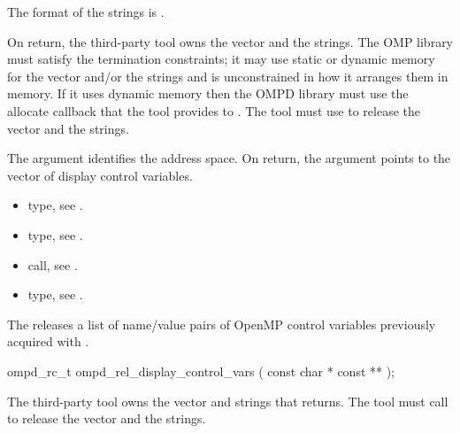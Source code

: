 The format of the strings is .

On return, the third-party tool owns the vector and the strings. The OMP library
must satisfy the termination constraints; it may use static or dynamic memory 
for the vector and/or the strings and is unconstrained in how it arranges them 
in memory. If it uses dynamic memory then the OMPD library must use the allocate 
callback that the tool provides to . The tool must use 
 to release the vector and the strings.

\argdesc
The  argument identifies the address space. On return, 
the   argument points to the vector of display control variables.

\crossreferences
\begin{itemize}
\item {} type, 
see .

\item {} type, see .

\item {} call, see .

\item {} type, 
see .
\end{itemize}



\label{subsubsubsec:ompd_rel_display_control_vars}

\summary
The  releases a list of name/value pairs 
of OpenMP control variables previously acquired with 
.

\format
\begin{cspecific}
\begin{ompSyntax}
ompd_rc_t ompd_rel_display_control_vars (
  const char * const **
);
\end{ompSyntax}
\end{cspecific}

\descr
The third-party tool owns the vector and strings that 
 returns. The tool must call
 to release the vector and the strings.

